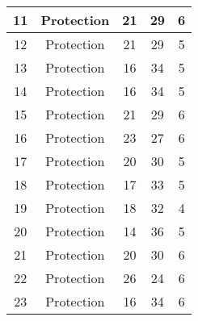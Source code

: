 \documentclass[results.tex]{subfiles}
\begin{document}
\begin{center}
\begin{tabular}{| c || c | c | c | c |}
            \hline
            11                      & Protection                   & 21                     & 29                      & 6                    \\
            \hline
            12                      & Protection                   & 21                     & 29                      & 5                    \\
            \hline
            13                      & Protection                   & 16                     & 34                      & 5                    \\
            \hline
            14                      & Protection                   & 16                     & 34                      & 5                    \\
            \hline
            15                      & Protection                   & 21                     & 29                      & 6                    \\
            \hline
            16                      & Protection                   & 23                     & 27                      & 6                    \\
            \hline
            17                      & Protection                   & 20                     & 30                      & 5                    \\
            \hline
            18                      & Protection                   & 17                     & 33                      & 5                    \\
            \hline
            19                      & Protection                   & 18                     & 32                      & 4                    \\
            \hline
            20                      & Protection                   & 14                     & 36                      & 5                    \\
            \hline
            21                      & Protection                   & 20                     & 30                      & 6                    \\
            \hline
            22                      & Protection                   & 26                     & 24                      & 6                    \\
            \hline
            23                      & Protection                   & 16                     & 34                      & 6                    \\

\end{tabular}
\end{center}
\end{document}
